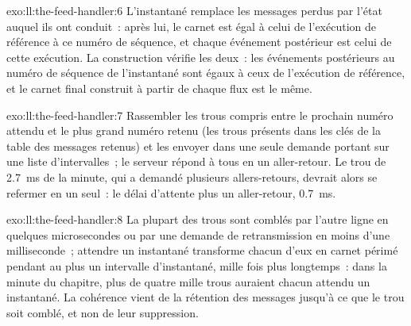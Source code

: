 \begin{solution}{exo:ll:the-feed-handler:6}
L'instantané remplace les messages perdus par l'état auquel ils ont conduit~: après lui, le carnet est égal à celui de l'exécution de référence
à ce numéro de séquence, et chaque événement postérieur est celui de cette exécution. La construction vérifie les deux~: les événements postérieurs au
numéro de séquence de l'instantané sont égaux à ceux de l'exécution de référence, et le carnet final construit à partir de chaque flux est le même.
\end{solution}

\begin{solution}{exo:ll:the-feed-handler:7}
Rassembler les trous compris entre le prochain numéro attendu et le plus grand numéro retenu (les trous présents dans les clés de la table des messages retenus) et les envoyer
dans une seule demande portant sur une liste d'intervalles~; le serveur répond à tous en un aller-retour. Le trou de \qty{2.7}{\milli\second} de la
minute, qui a demandé plusieurs allers-retours, devrait alors se refermer en un seul~: le délai d'attente plus un aller-retour, \qty{0.7}{\milli\second}.
\end{solution}

\begin{solution}{exo:ll:the-feed-handler:8}
La plupart des trous sont comblés par l'autre ligne en quelques microsecondes ou par une demande de retransmission en moins d'une milliseconde~; attendre un instantané
transforme chacun d'eux en carnet périmé pendant au plus un intervalle d'instantané, mille fois plus longtemps~: dans la minute du chapitre, plus
de quatre mille trous auraient chacun attendu un instantané. La cohérence vient de la rétention des messages jusqu'à ce que le trou soit comblé, et non de leur suppression.
\end{solution}

